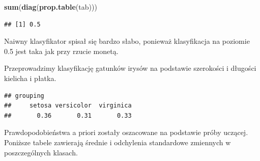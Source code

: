 \documentclass[]{book}
\newenvironment{Shaded}{\begin{snugshade}}{\end{snugshade}}
\newcommand{\DataTypeTok}[1]{\textcolor[rgb]{0.13,0.29,0.53}{#1}}
\newcommand{\DecValTok}[1]{\textcolor[rgb]{0.00,0.00,0.81}{#1}}
\newcommand{\KeywordTok}[1]{\textcolor[rgb]{0.13,0.29,0.53}{\textbf{#1}}}
\newcommand{\NormalTok}[1]{#1}
\newcommand{\OperatorTok}[1]{\textcolor[rgb]{0.81,0.36,0.00}{\textbf{#1}}}
\newcommand{\StringTok}[1]{\textcolor[rgb]{0.31,0.60,0.02}{#1}}
\theoremstyle{plain}
\theoremstyle{definition}
\theoremstyle{definition}
\theoremstyle{definition}
\theoremstyle{definition}
\theoremstyle{remark}
\let\BeginKnitrBlock\begin \let\EndKnitrBlock\end
\begin{document}
\begin{Shaded}
\begin{Highlighting}[]
\KeywordTok{sum}\NormalTok{(}\KeywordTok{diag}\NormalTok{(}\KeywordTok{prop.table}\NormalTok{(tab)))}
\end{Highlighting}
\end{Shaded}

\begin{verbatim}
## [1] 0.5
\end{verbatim}

Naiwny klasyfikator spisał się bardzo słabo, ponieważ klasyfikacja na poziomie 0.5 jest taka jak przy rzucie monetą.

\BeginKnitrBlock{example}
\protect\hypertarget{exm:unnamed-chunk-78}{}{\label{exm:unnamed-chunk-78} }Przeprowadzimy klasyfikację gatunków irysów na podstawie szerokości i długości kielicha i płatka.
\EndKnitrBlock{example}

\begin{Shaded}
\end{Shaded}

\begin{verbatim}
## grouping
##     setosa versicolor  virginica 
##       0.36       0.31       0.33
\end{verbatim}

Prawdopodobieństwa a priori zostały oszacowane na podstawie próby uczącej. Poniższe tabele zawierają średnie i odchylenia standardowe zmiennych w poszczególnych klasach.

\begin{Shaded}
\end{Shaded}
\end{document}
